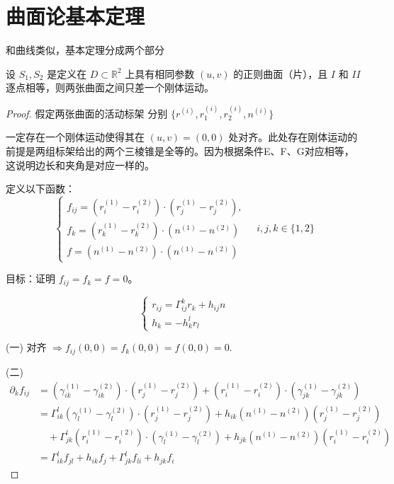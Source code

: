 \documentclass[lang=cn,10pt,thmcnt=section]{elegantbook}
\begin{document}
\section{曲面论基本定理}
和曲线类似，基本定理分成两个部分
\begin{theorem}[唯一性定理]
    设 \( S_1, S_2 \) 是定义在 \( D \subset \mathbb{R}^2 \) 上具有相同参数 \( (u, v) \) 的正则曲面（片），且 \( I \) 和 \( II \) 逐点相等，则两张曲面之间只差一个刚体运动。
\end{theorem}
\begin{proof}
    假定两张曲面的活动标架
分别 $\{r^{(i)}, r_1^{(i)}, r_2^{(i)}, n^{(i)}\}$

一定存在一个刚体运动使得其在 $(u,v) = (0,0)$ 处对齐。此处存在刚体运动的前提是两组标架给出的两个三棱锥是全等的。因为根据条件E、F、G对应相等，这说明边长和夹角是对应一样的。

定义以下函数：
\[
\begin{cases}
f_{ij} = (r_i^{(1)} - r_i^{(2)}) \cdot (r_j^{(1)} - r_j^{(2)}), \\
f_k = (r_k^{(1)} - r_k^{(2)}) \cdot (n^{(1)} - n^{(2)}) \\
f = (n^{(1)} - n^{(2)}) \cdot (n^{(1)} - n^{(2)})
\end{cases}
\quad i,j,k \in \{1,2\}
\]


目标：证明 $f_{ij} = f_k = f = 0$。

\[
\begin{cases}
r_{ij} = \Gamma_{ij}^k r_k + h_{ij} n \\
h_k = -h^l_k r_l
\end{cases}
\]

(一) 对齐 $\Rightarrow f_{ij}(0,0) = f_k(0,0) = f(0,0) = 0$.


(二) 
\begin{align*}
\partial_k f_{ij} &= \left( \gamma_{ik}^{(1)} - \gamma_{ik}^{(2)} \right) \cdot \left( r_j^{(1)} - r_j^{(2)} \right) + \left( r_i^{(1)} - r_i^{(2)} \right) \cdot \left( \gamma_{jk}^{(1)} - \gamma_{jk}^{(2)} \right) \\
&= \Gamma_{ik}^l \left( \gamma_l^{(1)} - \gamma_l^{(2)} \right) \cdot \left( r_j^{(1)} - r_j^{(2)} \right) + h_{ik} \left( n^{(1)} - n^{(2)} \right) \left( r_j^{(1)} - r_j^{(2)} \right) \\
&\quad + \Gamma_{jk}^l \left( r_i^{(1)} - r_i^{(2)} \right) \cdot \left( \gamma_l^{(1)} - \gamma_l^{(2)} \right) + h_{jk} \left( n^{(1)} - n^{(2)} \right) \left( r_i^{(1)} - r_i^{(2)} \right) \\
&= \Gamma_{ik}^l f_{jl} + h_{ik} f_j + \Gamma_{jk}^l f_{li} + h_{jk} f_i
\end{align*}


\end{proof}
\end{document}
